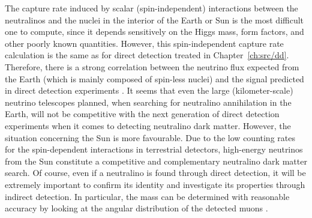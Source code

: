 \documentclass[a4paper,10pt,oneside]{book}
\begin{document}
The capture rate induced by scalar (spin-independent) interactions
between the neutralinos and the nuclei in the interior of the Earth or
Sun is the most difficult one to compute, since it depends sensitively
on the Higgs mass, form factors, and other poorly known quantities.
However, this spin-independent capture rate calculation is the same as
for direct detection treated in Chapter~\ref{ch:src/dd}.  Therefore,
there is a strong correlation between the neutrino flux expected from
the Earth (which is mainly composed of spin-less nuclei) and the
signal predicted in direct detection experiments \cite{Bergstrom:1998xh,Kamionkowski:1994dp}.
It seems that even the large (kilometer-scale) neutrino telescopes
planned, when searching for neutralino annihilation in the Earth, will
not be competitive with the next generation of direct detection
experiments when it comes to detecting neutralino dark matter.
However, the situation concerning the Sun is more favourable.  Due to
the low counting rates for the spin-dependent interactions in
terrestrial detectors, high-energy neutrinos from the Sun constitute a
competitive and complementary neutralino dark matter search.  Of
course, even if a neutralino is found through direct detection, it
will be extremely important to confirm its identity and investigate
its properties through indirect detection.  In particular, the mass
can be determined with reasonable accuracy by looking at the angular
distribution of the detected muons \cite{Edsjo:1995zc,Bergstrom:1997tp}.
\end{document}
